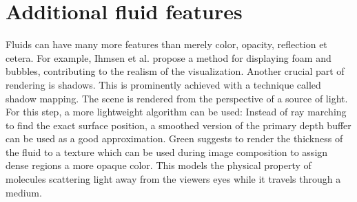 \section{Additional fluid features}

Fluids can have many more features than merely color, opacity, reflection et cetera. For example, Ihmsen et al. \cite{Ihmsen:2012} propose a method for displaying foam and bubbles, contributing to the realism of the visualization.
Another crucial part of rendering is shadows. This is prominently achieved with a technique called shadow mapping. The scene is rendered from the perspective of a source of light. For this step, a more lightweight algorithm can be used: Instead of ray marching to find the exact surface position, a smoothed version of the primary depth buffer can be used as a good approximation.
Green \cite{Green:2010} suggests to render the thickness of the fluid to a texture which can be used during image composition to assign dense regions a more opaque color. This models the physical property of molecules scattering light away from the viewers eyes while it travels through a medium.

